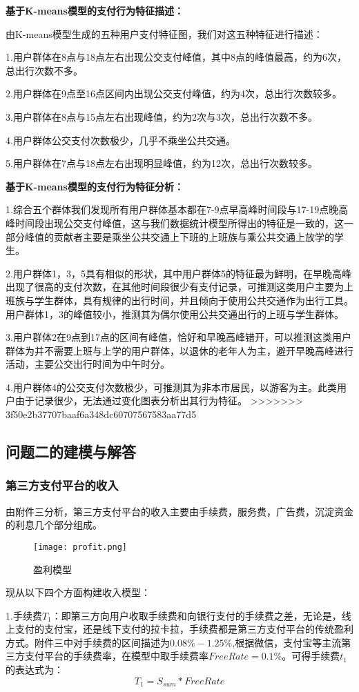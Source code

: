 \documentclass[withoutpreface,bwprint]{cumcmthesis} %
\begin{document}
\textbf{基于K-means模型的支付行为特征描述：}

由K-means模型生成的五种用户支付特征图，我们对这五种特征进行描述：

1.用户群体在8点与18点左右出现公交支付峰值，其中8点的峰值最高，约为6次，总出行次数不多。

2.用户群体在9点至16点区间内出现公交支付峰值，约为4次，总出行次数较多。

3.用户群体在8点与15点左右出现峰值，约为2次与3次，总出行次数不多。

4.用户群体公交支付次数极少，几乎不乘坐公共交通。

5.用户群体在7点与18点左右出现明显峰值，约为12次，总出行次数较多。

\textbf{基于K-means模型的支付行为特征分析：}

1.综合五个群体我们发现所有用户群体基本都在7-9点早高峰时间段与17-19点晚高峰时间段出现公交支付峰值，这与我们数据统计模型所得出的特征是一致的，这一部分峰值的贡献者主要是乘坐公共交通上下班的上班族与乘公共交通上放学的学生。

2.用户群体1，3，5具有相似的形状，其中用户群体5的特征最为鲜明，在早晚高峰出现了很高的支付次数，在其他时间段很少有支付记录，可推测这类用户主要为上班族与学生群体，具有规律的出行时间，并且倾向于使用公共交通作为出行工具。用户群体1，3的峰值较小，推测其为偶尔使用公共交通出行的上班与学生群体。

3.用户群体2在9点到17点的区间有峰值，恰好和早晚高峰错开，可以推测这类用户群体为并不需要上班与上学的用户群体，以退休的老年人为主，避开早晚高峰进行活动，主要公交出行时间为中午时分。

4.用户群体4的公交支付次数极少，可推测其为非本市居民，以游客为主。此类用户由于记录很少，无法通过变化图表分析出其行为特征。
>>>>>>> 3f50e2b37707baaf6a348dc60707567583aa77d5

\subsection{问题二的建模与解答}
\subsubsection{第三方支付平台的收入}
由附件三分析，第三方支付平台的收入主要由手续费，服务费，广告费，沉淀资金的利息几个部分组成。
\begin{figure}[h]
\centering
\texttt{[image: profit.png]}
\caption{盈利模型}
\end{figure}
现从以下四个方面构建收入模型：

1.手续费$T_1$：即第三方向用户收取手续费和向银行支付的手续费之差，无论是，线上支付的支付宝，还是线下支付的拉卡拉，手续费都是第三方支付平台的传统盈利方式。附件三中对手续费的区间描述为$0.08\%-1.25\%$,根据微信，支付宝等主流第三方支付平台的手续费率，在模型中取手续费率$FreeRate=0.1\%$。可得手续费$t_1$的表达式为：
\begin{equation}
T_1=S_{sum}*FreeRate
\end{equation}
\end{document}
